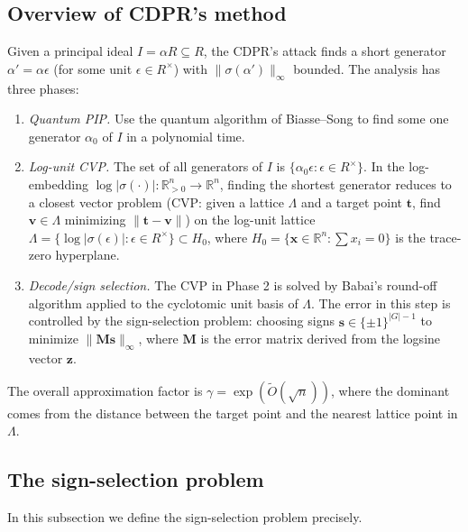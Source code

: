 \documentclass[11pt,a4paper]{article}
\theoremstyle{plain}
\theoremstyle{definition}
\theoremstyle{remark}
\newcommand{\R}{\mathbb{R}}
\newcommand{\tO}{\tilde{O}}
\begin{document}
\subsection{Overview of CDPR's method}\label{subsec:cdpr-overview}

Given a principal ideal $I=\alpha R\subseteq R$, the CDPR's attack finds a short generator $\alpha'=\alpha\epsilon$ (for some unit $\epsilon\in R^\times$) with $\|\sigma(\alpha')\|_\infty$ bounded. The analysis has three phases:
\begin{enumerate}[label=\textbf{Phase \arabic*:},leftmargin=*,nosep]
\item \textsl{Quantum PIP.} Use the quantum algorithm of Biasse–Song \cite{BiasseSong16,EHKS14} to find some one generator $\alpha_0$ of $I$ in a polynomial time. 

\item \textsl{Log-unit CVP.} The set of all generators of $I$ is $\{\alpha_0\epsilon: \epsilon\in R^\times\}$. In the log-embedding $\log|\sigma(\cdot)|: \R_{>0}^n\to\R^n$, finding the shortest generator reduces to a closest vector problem (CVP: given a lattice $\Lambda$ and a target point $\mathbf{t}$, find $\mathbf{v}\in\Lambda$ minimizing $\|\mathbf{t}-\mathbf{v}\|$) on the log-unit lattice $\Lambda=\{\log|\sigma(\epsilon)|: \epsilon\in R^\times\}\subset H_0$, where $H_0=\{\mathbf{x}\in\R^n: \sum x_i=0\}$ is the trace-zero hyperplane.

\item \textsl{Decode/sign selection.} The CVP in Phase 2 is solved by Babai's round-off algorithm \cite{Babai86} applied to the cyclotomic unit basis of $\Lambda$. The error in this step is controlled by the sign-selection problem: choosing signs $\mathbf{s}\in\{\pm 1\}^{|G|-1}$ to minimize $\|\mathbf{M}\mathbf{s}\|_\infty$, where $\mathbf{M}$ is the error matrix derived from the logsine vector $\mathbf{z}$.
\end{enumerate}

The overall approximation factor is $\gamma=\exp(\tO(\sqrt{n}))$, where the dominant comes from the distance between the target point and the nearest lattice point in $\Lambda$. 

\subsection{The sign-selection problem}\label{subsec:sign-def}

In this subsection we define the sign-selection problem precisely. 
\end{document}
